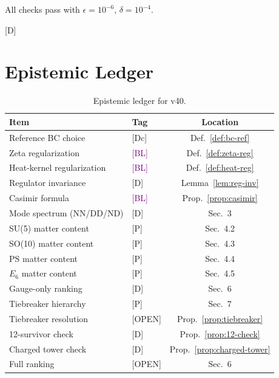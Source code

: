 \documentclass[11pt,a4paper]{article}
\newcommand{\tagD}{\textcolor{blue!70!black}{[D]}}
\newcommand{\tagDc}{\textcolor{blue!50!black}{[Dc]}}
\newcommand{\tagP}{\textcolor{green!50!black}{[P]}}
\newcommand{\tagBL}{\textcolor{purple}{[BL]}}
\newcommand{\tagOPEN}{\textcolor{red!70!black}{[OPEN]}}
\begin{document}
All checks pass with $\epsilon = 10^{-6}$, $\delta = 10^{-4}$.

\tagD

\section{Epistemic Ledger}
\label{app:ledger}

\begin{table}[h]
\centering
\begin{tabular}{llc}
\toprule
Item & Tag & Location \\
\midrule
Reference BC choice & \tagDc & Def.~\ref{def:bc-ref} \\
Zeta regularization & \tagBL & Def.~\ref{def:zeta-reg} \\
Heat-kernel regularization & \tagBL & Def.~\ref{def:heat-reg} \\
Regulator invariance & \tagD & Lemma~\ref{lem:reg-inv} \\
Casimir formula & \tagBL & Prop.~\ref{prop:casimir} \\
Mode spectrum (NN/DD/ND) & \tagD & Sec.~3 \\
SU(5) matter content & \tagP & Sec.~4.2 \\
SO(10) matter content & \tagP & Sec.~4.3 \\
PS matter content & \tagP & Sec.~4.4 \\
$E_6$ matter content & \tagP & Sec.~4.5 \\
Gauge-only ranking & \tagD & Sec.~6 \\
Tiebreaker hierarchy & \tagP & Sec.~7 \\
Tiebreaker resolution & \tagOPEN & Prop.~\ref{prop:tiebreaker} \\
12-survivor check & \tagD & Prop.~\ref{prop:12-check} \\
Charged tower check & \tagD & Prop.~\ref{prop:charged-tower} \\
Full ranking & \tagOPEN & Sec.~6 \\
\bottomrule
\end{tabular}
\caption{Epistemic ledger for v40.}
\label{tab:ledger}
\end{table}

\end{document}

